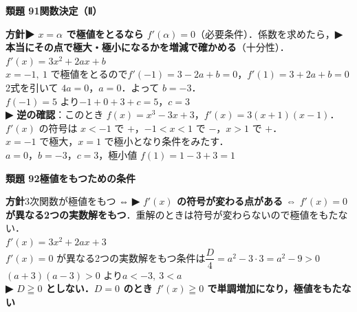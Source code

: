 \documentclass[a4paper,11pt]{ltjsarticle}
\newcommand{\ans}[2]{\Needspace{5\baselineskip}\vspace{6pt}%
  {\sffamily\bfseries 類題 #1\quad #2}\par}
\newcommand{\point}[1]{\textsf{\bfseries ▶ #1}}
\newcommand{\ax}[4]{\draw[->] (#1,0)--(#2,0) node[right]{\scriptsize $x$};
  \draw[->] (0,#3)--(0,#4) node[above]{\scriptsize $y$};
  \node[below left] at (0,0){\scriptsize O};}
\begin{document}
\ans{91}{関数決定（Ⅱ）}
\begin{kai}
\textbf{方針}\quad \point{$x=\alpha$ で極値をとるなら $f'(\alpha)=0$}（必要条件）．係数を求めたら，\point{本当にその点で極大・極小になるかを増減で確かめる}（十分性）．\\[2pt]
$f'(x)=3x^2+2ax+b$\\
$x=-1,\ 1$ で極値をとるので\quad $f'(-1)=3-2a+b=0$，\quad $f'(1)=3+2a+b=0$\\
2式を引いて $4a=0$，$a=0$．よって $b=-3$．\\
$f(-1)=5$ より\quad $-1+0+3+c=5$，\quad $c=3$\\[2pt]
\point{逆の確認}：このとき $f(x)=x^3-3x+3$，$f'(x)=3(x+1)(x-1)$．\\
\hspace*{1.5em}$f'(x)$ の符号は $x<-1$ で $+$，$-1<x<1$ で $-$，$x>1$ で $+$．\\
\hspace*{1.5em}$x=-1$ で極大，$x=1$ で極小となり条件をみたす．\\[2pt]
$a=0$，$b=-3$，$c=3$，\quad 極小値 $f(1)=1-3+3=1$
\begin{center}
\end{center}
\end{kai}

\ans{92}{極値をもつための条件}
\begin{kai}
\textbf{方針}\quad 3次関数が極値をもつ ⇔ \point{$f'(x)$ の符号が変わる点がある ⇔ $f'(x)=0$ が異なる2つの実数解をもつ}．重解のときは符号が変わらないので極値をもたない．\\[2pt]
$f'(x)=3x^2+2ax+3$\\
$f'(x)=0$ が異なる2つの実数解をもつ条件は\quad $\dfrac D4=a^2-3\cdot3=a^2-9>0$\\
$(a+3)(a-3)>0$ より\quad $a<-3,\ 3<a$\\
\point{$D\geqq0$ としない．$D=0$ のとき $f'(x)\geqq0$ で単調増加になり，極値をもたない}
\end{kai}
\end{document}
